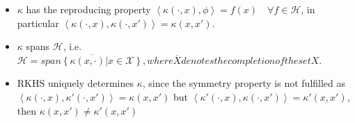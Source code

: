 \documentclass[runningheads]{llncs}
\newenvironment{reviewer}{\setcounter{pointcounter}{1}}{}
\begin{document}
\begin{reviewer}
{{\begin{definition}
    \begin{itemize}
        \item $\kappa$ has the reproducing property $\left< \kappa(\cdot,x), \phi \right> = f(x) \quad \forall f \in \mathcal{H}$, in particular $\left< \kappa(\cdot,x), \kappa(\cdot,x') \right> = \kappa(x,x')$.
        \item $\kappa$ spans $\mathcal{H}$, i.e. $\mathcal{H} = \overline{span\left\{ \kappa\left( x,\cdot \right) | x \in \mathcal{X}\right\}}, where \overline{X} denotes the completion of the set X$.
        \item RKHS uniquely determines $\kappa$, since the symmetry property is not fulfilled as $\left< \kappa(\cdot,x), \kappa'(\cdot,x') \right> = \kappa(x,x')$ but $\left< \kappa'(\cdot,x), \kappa(\cdot,x') \right> = \kappa'(x,x')$, then $\kappa(x,x') \neq  \kappa'(x,x')$
    \end{itemize}
\end{definition}
}
}


\end{reviewer}
\end{document}
